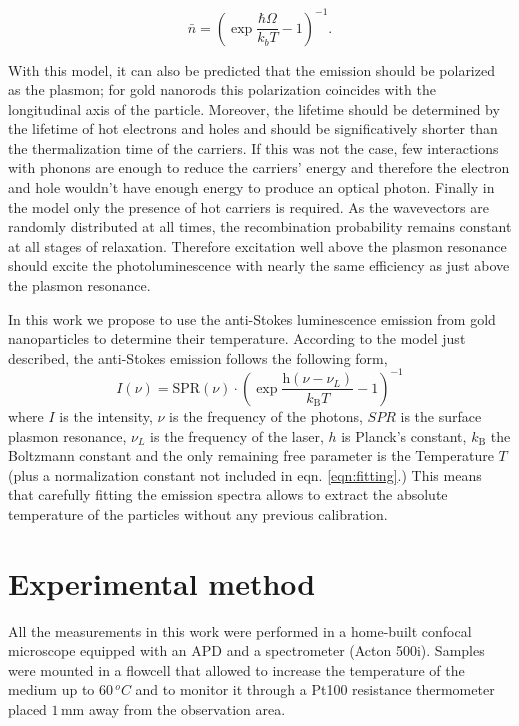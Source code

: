 \documentclass[journal=nalefd,manuscript=letter]{achemso}
\newcommand{\mm}{\ensuremath{\,\textrm{mm}}}
\begin{document}
\begin{equation}
	\bar{n}=\left(\exp\frac{\hbar\Omega}{k_bT}-1\right)^{-1}.
\end{equation}

With this model, it can also be predicted that the emission should be polarized
as the plasmon; for gold nanorods this polarization coincides with the
longitudinal axis of the particle\cite{He2015}. Moreover, the lifetime should be
determined by the lifetime of hot electrons and holes and should be
significatively shorter than the thermalization time of the carriers. If this
was not the case, few interactions with phonons are enough to reduce the
carriers' energy and therefore the electron and hole wouldn't have enough energy
to produce an optical photon. Finally in the model only the presence of hot
carriers is required. As the wavevectors are randomly distributed at all times,
the recombination probability remains constant at all stages of relaxation.
Therefore excitation well above the plasmon resonance should excite the
photoluminescence with nearly the same efficiency as just above the plasmon
resonance.

In this work we propose to use the anti-Stokes luminescence emission from gold
nanoparticles to determine their temperature. According to the model just
described, the anti-Stokes emission follows the following form,
\begin{equation}\label{eqn:fitting}
	I(\nu) =
	\textrm{SPR}(\nu)\cdot\left(\exp\frac{\textrm{h}(\nu-\nu_L)}{k_\textrm{B}T}-1\right)^{-1}
\end{equation}
where $I$ is the intensity, $\nu$ is the frequency of the photons, $SPR$ is the
surface plasmon resonance, $\nu_L$ is the frequency of the laser, $h$ is
Planck's constant, $k_\textrm{B}$ the Boltzmann constant and the only remaining
free parameter is the Temperature $T$ (plus a normalization constant not
included in eqn. \ref{eqn:fitting}.) This means that carefully fitting the
emission spectra allows to extract the absolute temperature of the
particles without any previous calibration.

\section{Experimental method}
All the measurements in this work were performed in a home-built confocal
microscope equipped with an APD and a spectrometer (Acton 500i). Samples were
mounted in a flowcell that allowed to increase the temperature of the medium up
to $60\,^oC$ and to monitor it through a Pt100 resistance thermometer placed
$1\mm$ away from the observation area.
\end{document}
